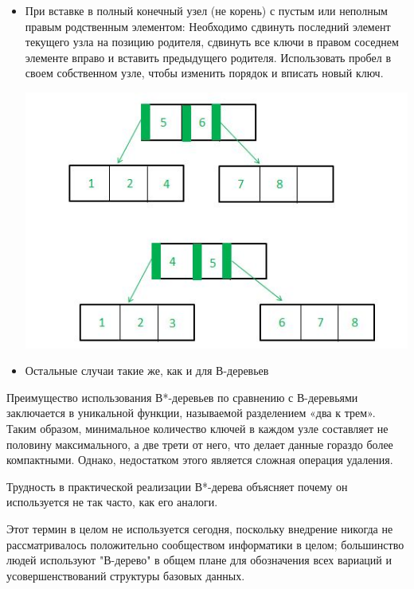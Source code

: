 \begin{enumerate}
\begin{itemize}
\begin{center}
            \end{center}
            \newpage
            \item При вставке в полный конечный узел (не корень) с пустым или неполным правым родственным элементом: Необходимо сдвинуть последний элемент текущего узла на позицию родителя, сдвинуть все ключи в правом соседнем элементе вправо и вставить предыдущего родителя. Использовать пробел в своем собственном узле, чтобы изменить порядок и вписать новый ключ.
            \begin{center}
                \includegraphics[width=0.6\linewidth]{gfg32.jpg} \par
            \end{center}
            \item Остальные случаи такие же, как и для В-деревьев

        \end{itemize}
    \end{enumerate}
    Преимущество использования В*-деревьев по сравнению с В-деревьями заключается в уникальной функции, называемой разделением «два к трем». Таким образом, минимальное количество ключей в каждом узле составляет не половину максимального, а две трети от него, что делает данные гораздо более компактными. Однако, недостатком этого является сложная операция удаления. \par
    Трудность в практической реализации В*-дерева объясняет почему он используется не так часто, как его аналоги.\par
    Этот термин в целом не используется сегодня, поскольку внедрение никогда не рассматривалось положительно сообществом информатики в целом; большинство людей используют "В-дерево" в общем плане для обозначения всех вариаций и усовершенствований структуры базовых данных. \par
    \newpage
    
